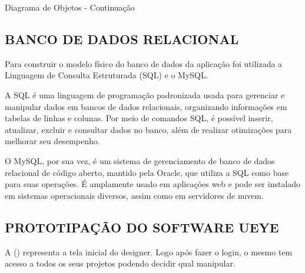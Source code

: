     \vspace{12pt}

    \begin{photograph}[H]
        \centering
        \caption{Diagrama de Objetos - Continuação}%
        \label{phot:pg-objetos2}
        \end{photograph}

\subsection*{BANCO DE DADOS RELACIONAL}
Para construir o modelo físico do banco de dados da aplicação foi utilizada a Linguagem de Consulta Estruturada (SQL) e o MySQL.

A SQL é uma linguagem de programação padronizada usada para gerenciar e manipular dados em bancos de dados relacionais, organizando informações em tabelas de linhas e colunas. Por meio de comandos SQL, é possível inserir, atualizar, excluir e consultar dados no banco, além de realizar otimizações para melhorar seu desempenho.

O MySQL, por sua vez, é um sistema de gerenciamento de banco de dados relacional de código aberto, mantido pela Oracle, que utiliza a SQL como base para suas operações. É amplamente usado em aplicações web e pode ser instalado em sistemas operacionais diversos, assim como em servidores de nuvem. \textcite{Amazon}\newline

\subsection*{PROTOTIPAÇÃO DO SOFTWARE UEYE}
A () representa a tela inicial do designer. Logo após fazer o login, o mesmo tem acesso a todos os seus projetos podendo decidir qual manipular.

